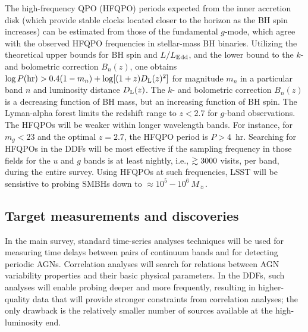 The high-frequency QPO (HFQPO) periods expected from the inner accretion disk
(which provide stable clocks located closer to the horizon as the BH spin increases)
can be estimated from those of the fundamental $g$-mode, which agree with
the observed HFQPO frequencies in stellar-mass BH binaries. Utilizing the
theoretical upper bounds for BH spin and $L/L_{\rm Edd}$, and the lower
bound to the $k$- and bolometric correction $B_n(z)$, one obtains
$\log P({\rm hr}) > 0.4(1-m_n) + \log[(1+z)D_{\rm L}(z)^2]$ for magnitude
$m_n$ in a particular band $n$ and luminosity distance $D_{\rm L}(z)$.
The $k$- and bolometric correction $B_n(z)$ is a decreasing function of BH mass,
but an increasing function of BH spin. The Lyman-alpha forest limits the redshift
range to $z < 2.7$ for $g$-band observations. The HFQPOs will be weaker within longer
wavelength bands.
For instance, for $m_g  <  23$ and the optimal $z =  2.7$, the HFQPO period is $P > 4$~hr.
%
Searching for HFQPOs in the DDFs will be most effective if the sampling frequency
in those fields for the $u$ and $g$ bands is at least nightly, i.e., $\gtrsim3000$
visits, per band, during the entire survey. Using HFQPOs at such frequencies, LSST will be
sensistive to probing SMBHs down to $\approx10^{5} - 10^{6}~M_{\sun}$. 



\subsection{Target measurements and discoveries}
\label{sec:\secname:targets}


In the main survey, standard time-series analyses techniques will be used
for measuring time delays between pairs of continuum bands and for detecting
periodic AGNs. Correlation analyses will search for relations between AGN
variability properties and their basic physical parameters. In the DDFs,
such analyses will enable probing deeper and more frequently, resulting in
higher-quality data that will provide stronger constraints from correlation
analyses; the only drawback is the relatively smaller number of sources
available at the high-luminosity end.

